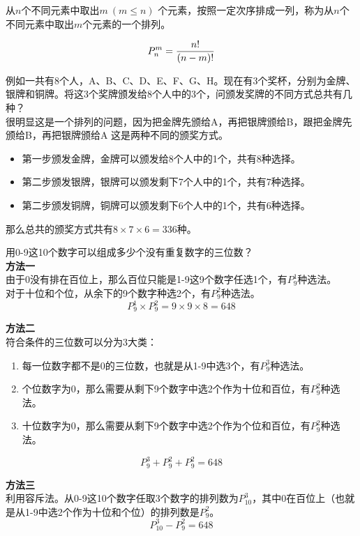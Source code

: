 从$ n $个不同元素中取出$ m\ (m \le n) $ 个元素，按照一定次序排成一列，称为从$ n $个不同元素中取出$ m $个元素的一个排列。

\vspace{-1cm}

\begin{align}
	P_n^m = {n! \over (n-m)!}
\end{align}

例如一共有8个人，A、B、C、D、E、F、G、H。现在有3个奖杯，分别为金牌、银牌和铜牌。将这3个奖牌颁发给8个人中的3个，问颁发奖牌的不同方式总共有几种？\\

很明显这是一个排列的问题，因为把金牌先颁给A，再把银牌颁给B，跟把金牌先颁给B，再把银牌颁给A 这是两种不同的颁奖方式。

\begin{itemize}
	\item 第一步颁发金牌，金牌可以颁发给8个人中的1个，共有8种选择。

	\item 第二步颁发银牌，银牌可以颁发剩下7个人中的1个，共有7种选择。

	\item 第二步颁发铜牌，铜牌可以颁发剩下6个人中的1个，共有6种选择。
\end{itemize}

那么总共的颁奖方式共有$ 8 \times 7 \times 6 = 336 $种。

\begin{tcolorbox}
	用0-9这10个数字可以组成多少个没有重复数字的三位数？\\

	\textbf{方法一}\\
	由于0没有排在百位上，那么百位只能是1-9这9个数字任选1个，有$ P_9^1 $种选法。\\
	对于十位和个位，从余下的9个数字种选2个，有$ P_9^2 $种选法。
	$$
		P_9^1 \times P_9^2 = 9 \times 9 \times 8 = 648
	$$

	\textbf{方法二}\\
	符合条件的三位数可以分为3大类：
	\begin{enumerate}
		\item 每一位数字都不是0的三位数，也就是从1-9中选3个，有$ P_9^3 $种选法。

		\item 个位数字为0，那么需要从剩下9个数字中选2个作为十位和百位，有$ P_9^2 $种选法。

		\item 十位数字为0，那么需要从剩下9个数字中选2个作为个位和百位，有$ P_9^2 $种选法。
	\end{enumerate}
	$$
		P_9^3 + P_9^2 + P_9^2 = 648
	$$

	\textbf{方法三}\\
	利用容斥法。从0-9这10个数字任取3个数字的排列数为$ P_{10}^3 $，其中0在百位上（也就是从1-9中选2个作为十位和个位）的排列数是$ P_9^2 $。
	$$
		P_{10}^3 - P_9^2 = 648
	$$
\end{tcolorbox}


